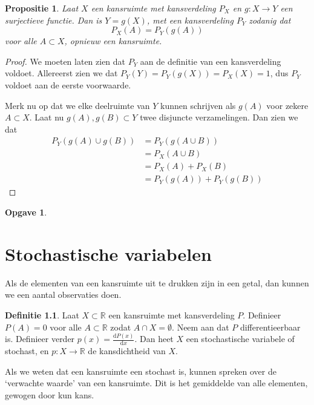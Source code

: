 \documentclass[a4paper]{book}
\newtheorem{proposition}[theorem]{Propositie}
\newtheorem{exercise}[theorem]{Opgave}
\theoremstyle{definition}
\newtheorem{definition}[theorem]{Definitie}
\begin{document}
\begin{proposition}
    Laat $X$ een kansruimte met kansverdeling $P_X$ en $g: X \to Y$ een surjectieve functie.
    Dan is $Y = g(X)$, met een kansverdeling $P_Y$ zodanig dat
    \[ P_X(A) = P_Y(g(A)) \]
    voor alle $A \subset X$, opnieuw een kansruimte.
\end{proposition}
\begin{proof}
    We moeten laten zien dat $P_Y$ aan de definitie van een kansverdeling voldoet.
    Allereerst zien we dat $P_Y(Y) = P_Y(g(X)) = P_X(X) = 1$, dus $P_Y$ voldoet aan de eerste voorwaarde.

    Merk nu op dat we elke deelruimte van $Y$ kunnen schrijven als $g(A)$ voor zekere $A \subset X$.
    Laat nu $g(A),g(B) \subset Y$ twee disjuncte verzamelingen.
    Dan zien we dat
    \begin{align*}
        P_Y(g(A) \cup g(B)) &= P_Y(g(A \cup B)) \\
                            &= P_X(A \cup B) \\
                            &= P_X(A) + P_X(B) \\
                            &= P_Y(g(A)) + P_Y(g(B))
    \end{align*}
\end{proof}

\begin{exercise}
\end{exercise}



\chapter{Stochastische variabelen}
Als de elementen van een kansruimte uit te drukken zijn in een getal, dan kunnen we een aantal observaties doen.

\begin{definition}
    Laat $X \subset \mathbb{R}$ een kansruimte met kansverdeling $P$.
    Definieer $P(A) = 0$ voor alle $A \subset \mathbb{R}$ zodat $A \cap X = \emptyset$.
    Neem aan dat $P$ differentieerbaar is.
    Definieer verder $p(x) = \frac{\mathrm{d}P(x)}{\mathrm{d}x}$.
    Dan heet $X$ een stochastische variabele of stochast, en $p: X \to \mathbb{R}$ de kansdichtheid van $X$.
\end{definition}

Als we weten dat een kansruimte een stochast is, kunnen spreken over de `verwachte waarde' van een kansruimte.
Dit is het gemiddelde van alle elementen, gewogen door kun kans.
\end{document}
